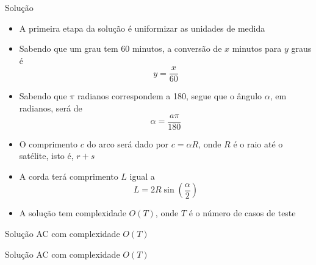 \begin{frame}[fragile]{Solução}

    \begin{itemize}
        \item A primeira etapa da solução é uniformizar as unidades de medida
        \pause

        \item Sabendo que um grau tem 60 minutos, a conversão de $x$ minutos para $y$ graus é
        \[
            y = \frac{x}{60}
        \]
        \pause

        \item Sabendo que $\pi$ radianos correspondem a 180\textdegree, segue que o ângulo $\alpha$,
            em radianos, será de
        \[
            \alpha = \frac{a\pi}{180}
        \]
        \pause

        \item O comprimento $c$ do arco será dado por $c = \alpha R$, onde $R$ é o raio até o satélite, isto é, $r + s$
        \pause

        \item A corda terá comprimento $L$ igual a
        \[
            L = 2R\sin(\frac{\alpha}{2})
        \]
        \pause

        \item A solução tem complexidade $O(T)$, onde $T$ é o número de casos de teste
    \end{itemize}

\end{frame}

\begin{frame}[fragile]{Solução AC com complexidade $O(T)$}
\end{frame}

\begin{frame}[fragile]{Solução AC com complexidade $O(T)$}
\end{frame}

